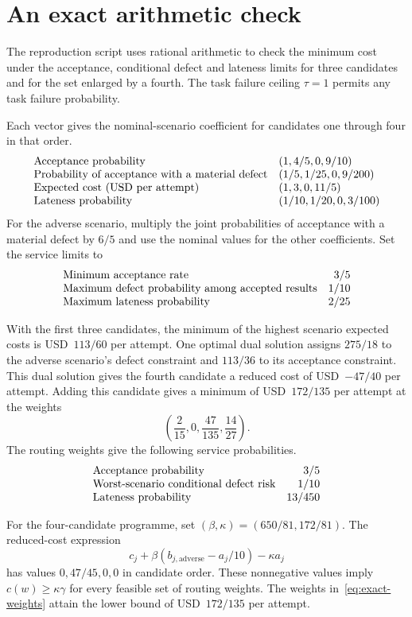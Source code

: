 \documentclass[11pt,reqno]{amsart}
\theoremstyle{definition}
\theoremstyle{remark}
\begin{document}
\appendix
\FloatBarrier
\section{An exact arithmetic check}
\label{app:exact}
The reproduction script uses rational arithmetic to check the minimum cost under the acceptance, conditional defect and lateness limits for three candidates and for the set enlarged by a fourth. The task failure ceiling $\tau=1$ permits any task failure probability.

Each vector gives the nominal-scenario coefficient for candidates one through four in that order.
\[
\begin{array}{@{}ll@{}}
\text{Acceptance probability} & (1,4/5,0,9/10)\\
\text{Probability of acceptance with a material defect} & (1/5,1/25,0,9/200)\\
\text{Expected cost (USD per attempt)} & (1,3,0,11/5)\\
\text{Lateness probability} & (1/10,1/20,0,3/100)
\end{array}
\]
For the adverse scenario, multiply the joint probabilities of acceptance with a material defect by $6/5$ and use the nominal values for the other coefficients.
Set the service limits to
\[
\begin{array}{@{}lr@{}}
\text{Minimum acceptance rate} & 3/5\\
\text{Maximum defect probability among accepted results} & 1/10\\
\text{Maximum lateness probability} & 2/25
\end{array}
\]

With the first three candidates, the minimum of the highest scenario expected costs is USD~$113/60$ per attempt.
One optimal dual solution assigns $275/18$ to the adverse scenario's defect constraint and $113/36$ to its acceptance constraint.
This dual solution gives the fourth candidate a reduced cost of USD~$-47/40$ per attempt.
Adding this candidate gives a minimum of USD~$172/135$ per attempt at the weights
\begin{equation}
\left(\frac2{15},0,\frac{47}{135},\frac{14}{27}\right).
\label{eq:exact-weights}
\end{equation}
The routing weights give the following service probabilities.
\[
\begin{array}{@{}lr@{}}
\text{Acceptance probability} & 3/5\\
\text{Worst-scenario conditional defect risk} & 1/10\\
\text{Lateness probability} & 13/450
\end{array}
\]

For the four-candidate programme, set $(\beta,\kappa)=(650/81,172/81)$. The reduced-cost expression
\begin{equation}
c_j+\beta(b_{j,\mathrm{adverse}}-a_j/10)-\kappa a_j
\label{eq:exact-slack}
\end{equation}
has values $0,47/45,0,0$ in candidate order. These nonnegative values imply $c(w)\ge\kappa\gamma$ for every feasible set of routing weights.
The weights in~\eqref{eq:exact-weights} attain the lower bound of USD~$172/135$ per attempt.

\begingroup
\raggedright


\endgroup
\end{document}
